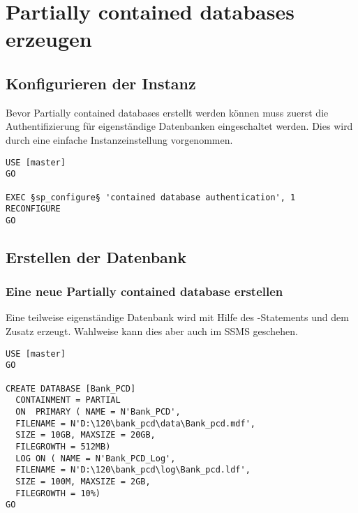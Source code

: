       \section{Partially contained databases erzeugen}
        \subsection{Konfigurieren der Instanz}
          Bevor Partially contained databases erstellt werden können muss zuerst
          die Authentifizierung für eigenständige Datenbanken eingeschaltet
          werden. Dies wird durch eine einfache Instanzeinstellung vorgenommen.
          \begin{lstlisting}[language=ms_sql,caption={Eigen\-stän\-dige Daten\-banken
          aktivieren},label=sql20_01]
USE [master]
GO

EXEC §sp_configure§ 'contained database authentication', 1
RECONFIGURE
GO          
          \end{lstlisting}
        \subsection{Erstellen der Datenbank}
          \subsubsection{Eine neue Partially contained database erstellen}
            Eine teilweise eigenständige Datenbank wird mit Hilfe des
            -Statements und dem Zusatz
             erzeugt. Wahlweise kann dies
            aber auch im SSMS geschehen.
            \begin{lstlisting}[language=ms_sql,caption={Erstellen einer teilweise eigen\-stän\-digen Daten\-bank},label=sql20_02]
USE [master]
GO

CREATE DATABASE [Bank_PCD]
  CONTAINMENT = PARTIAL
  ON  PRIMARY ( NAME = N'Bank_PCD',
  FILENAME = N'D:\120\bank_pcd\data\Bank_pcd.mdf',
  SIZE = 10GB, MAXSIZE = 20GB,
  FILEGROWTH = 512MB)
  LOG ON ( NAME = N'Bank_PCD_Log',
  FILENAME = N'D:\120\bank_pcd\log\Bank_pcd.ldf',
  SIZE = 100M, MAXSIZE = 2GB,
  FILEGROWTH = 10%)
GO
            \end{lstlisting}
